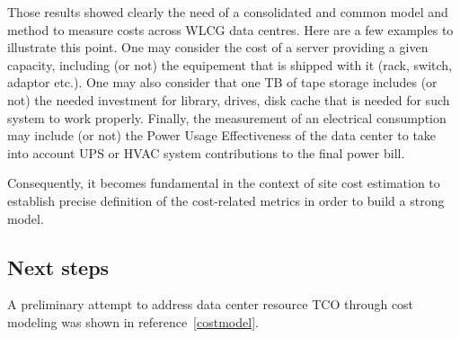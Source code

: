 Those results showed clearly the need of a consolidated and common model and method to measure costs across
WLCG data centres.
Here are a few examples to illustrate this point. One may consider the cost of a server providing a given capacity,
including (or not) the equipement that is shipped with it (rack, switch, adaptor etc.).
One may also consider that one TB of tape storage includes (or not) the needed investment for library, drives, disk cache
that is needed for such system to work properly.
Finally, the measurement of an electrical consumption may include (or not) the Power Usage Effectiveness of the data center
to take into account UPS or HVAC system contributions to the final power bill.

Consequently, it becomes fundamental in the context of site cost
estimation to establish precise definition of the cost-related metrics in order to build a strong model.

\subsection{Next steps}

A preliminary attempt to address data center resource TCO through cost modeling was shown in reference~\ref{costmodel}.
